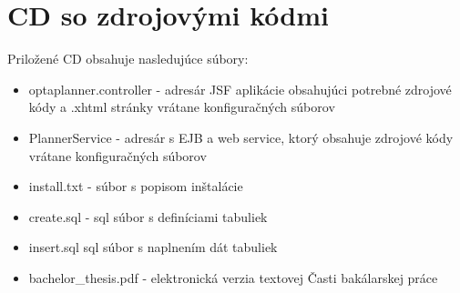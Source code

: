 \chapter{CD so zdrojovými kódmi}
{
	Priložené CD obsahuje nasledujúce súbory:
	\begin{itemize}
	\item optaplanner.controller - adresár JSF aplikácie obsahujúci potrebné zdrojové kódy a .xhtml stránky vrátane konfiguračných súborov
	\item PlannerService - adresár s EJB a web service, ktorý obsahuje zdrojové kódy vrátane konfiguračných súborov
	\item install.txt - súbor s popisom inštalácie
	\item create.sql - sql súbor s definíciami tabuliek
	\item insert.sql sql súbor s naplnením dát tabuliek
	\item bachelor\_thesis.pdf - elektronická verzia textovej Časti bakálarskej práce
	\end{itemize}
}

